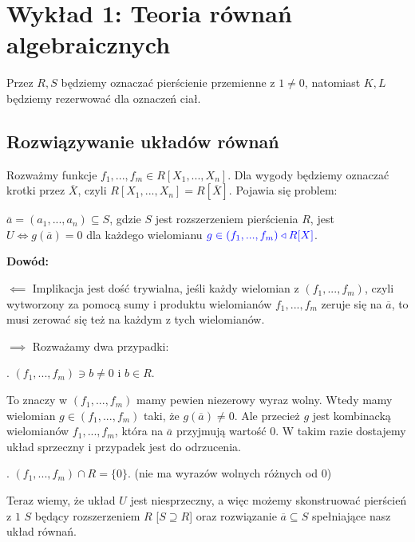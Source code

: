 \section{Wykład 1: Teoria równań algebraicznych}

Przez $R, S$ będziemy oznaczać pierścienie przemienne z $1\neq0$, natomiast $K, L$ będziemy rezerwować dla oznaczeń ciał.

\subsection{Rozwiązywanie układów równań}

Rozważmy funkcje $f_1,...,f_m\in R[X_1, ..., X_n]$. Dla wygody będziemy oznaczać krotki przez $\overline X$, czyli $R[X_1,...,X_n]=R[\overline X]$. Pojawia się problem: 

\begin{fakt}
    $\overline a=(a_1,...,a_n)\subseteq S$, gdzie $S$ jest rozszerzeniem pierścienia $R$, jest  $U\iff g(\overline a)=0$ dla każdego wielomianu $\color{blue}g\in (f_1,...,f_m)\triangleleft R[X]$.
\end{fakt}

\textbf{Dowód:} 

$\impliedby$ Implikacja jest dość trywialna, jeśli każdy wielomian z $(f_1,...,f_m)$, czyli wytworzony za pomocą sumy i produktu wielomianów $f_1,...,f_m$ zeruje się na $\overline a$, to musi zerować się też na każdym z tych wielomianów.

$\implies$ Rozważamy dwa przypadki:

. $(f_1,...,f_m)\ni b\neq 0$ i $b\in R$. 

To znaczy w $(f_1,...,f_m)$ mamy pewien niezerowy wyraz wolny. Wtedy mamy wielomian $g\in(f_1,...,f_m)$ taki, że $g(\overline a)\neq 0$. Ale przecież $g$ jest kombinacką wielomianów $f_1,...,f_m$, która na $\overline a$ przyjmują wartość $0$. W takim razie dostajemy układ sprzeczny i przypadek jest do odrzucenia.

. $(f_1,...,f_m)\cap R=\{0\}$. (nie ma wyrazów wolnych różnych od $0$)

Teraz wiemy, że układ $U$ jest niesprzeczny, a więc możemy skonstruować pierścień z $1$ $S$ będący rozszerzeniem $R$ [$S\supseteq R$] oraz rozwiązanie $\overline a\subseteq S$ spełniające nasz układ równań.

